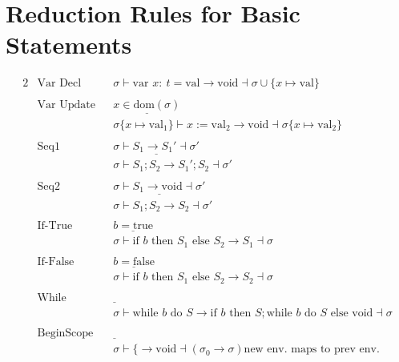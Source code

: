 \documentclass{article}
\begin{document}
\section*{Reduction Rules for Basic Statements}
\begin{alignat*}{2}
    &\text{Var Decl} &&\sigma \vdash \text{var } x: \ t = \text{val} \rightarrow \text{void} \dashv \sigma \cup \{x \mapsto \text{val}\} \\\\[10pt]
    &\text{Var Update} && \underline{x \in \text{dom}(\sigma)} \\ 
    & && \sigma\{x \mapsto \text{val}_1\} \vdash x := \text{val}_2 \rightarrow \text{void} \dashv \sigma\{x \mapsto \text{val}_2\} \\\\[10pt]
    &\text{Seq1} && \underline{\sigma \vdash S_1 \rightarrow S_1' \dashv \sigma'} \\ 
    & && \sigma \vdash S_1; S_2 \rightarrow S_1'; S_2 \dashv \sigma' \\\\[10pt]
    &\text{Seq2} && \underline{\sigma \vdash S_1 \rightarrow \text{void} \dashv \sigma'} \\ 
    & && \sigma \vdash S_1; S_2 \rightarrow S_2 \dashv \sigma' \\\\[10pt]
    &\text{If-True} && \underline{b = \text{true}} \\ 
    & && \sigma \vdash \text{if } b \text{ then } S_1 \text{ else } S_2 \rightarrow S_1 \dashv \sigma \\\\[10pt]
    &\text{If-False} && \underline{b = \text{false}} \\ 
    & && \sigma \vdash \text{if } b \text{ then } S_1 \text{ else } S_2 \rightarrow S_2 \dashv \sigma \\\\[10pt]
    &\text{While} && \underline{} \\ 
    & && \sigma \vdash \text{while } b \text{ do } S \rightarrow \text{if } b \text{ then } S; \text{while } b \text{ do } S \text{ else void} \dashv \sigma \\\\[10pt]
    &\text{BeginScope} && \underline{} \\ 
    & && \sigma \vdash \text{\{} \rightarrow \text{void} \dashv (\sigma_0 \rightarrow \sigma) \text{new env. maps to prev env.} \\\\[10pt]

\end{alignat*}
\end{document}
